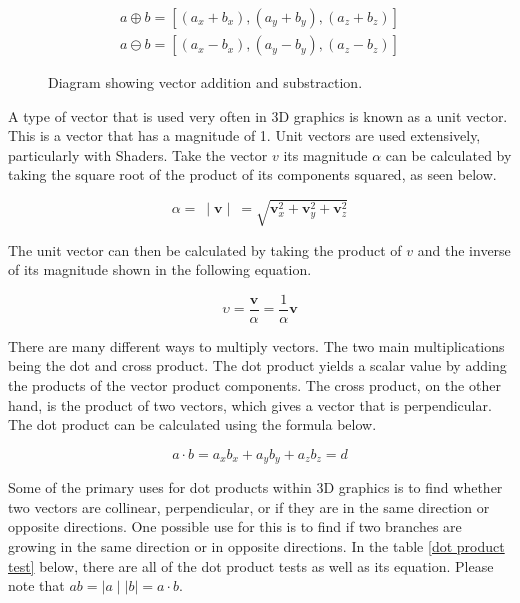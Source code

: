 \begin{equation}
\begin{aligned}
a \oplus b = [(a_x + b_x), (a_y + b_y), (a_z + b_z)]\\
a \ominus b = [(a_x - b_x), (a_y - b_y), (a_z - b_z)]
\end{aligned}
\end{equation}

\begin{figure}[htbp]
	{\centering
		\setlength{\fboxrule}{1pt}
		\vspace{7px}
		\caption{Diagram showing vector addition and substraction.}
	}
\end{figure}
\FloatBarrier

\noindent
A type of vector that is used very often in 3D graphics is known as a unit vector. This is a vector that has a magnitude of 1. Unit vectors are used extensively, particularly with \gls{Shader}s. Take the vector $v$ its magnitude $\alpha$ can be calculated by taking the square root of the product of its components squared, as seen below. 

\begin{equation}
	\alpha =~ \mid \textbf{v} \mid~ = \sqrt{\textbf{v}^2_x + \textbf{v}^2_y + \textbf{v}^2_z}
\end{equation}

The unit vector can then be calculated by taking the product of $v$ and the inverse of its magnitude shown in the following equation.

\begin{equation}
	\upsilon = \frac{\textbf{v}}{\alpha} = \frac{1}{\alpha} \textbf{v}
\end{equation}

There are many different ways to multiply vectors. The two main multiplications being the dot and cross product. The dot product yields a scalar value by adding the products of the vector product components. The cross product, on the other hand, is the product of two vectors, which gives a vector that is perpendicular. The dot product can be calculated using the formula below.

\begin{equation}
a \cdot b = a_x b_x + a_y b_y + a_z b_z = d
\end{equation}

\noindent
Some of the primary uses for dot products within 3D graphics is to find whether two vectors are collinear, perpendicular, or if they are in the same direction or opposite directions. One possible use for this is to find if two branches are growing in the same direction or in opposite directions. In the table \ref{dot product test} below, there are all of the dot product tests as well as its equation. Please note that $ab = \mid a \mid \mid b \mid = a \cdot b$.


